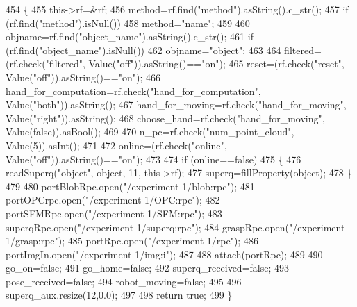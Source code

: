 \begin{DoxyCode}
454     \{
455         this->rf=&rf;
456         method=rf.find(\textcolor{stringliteral}{"method"}).asString().c\_str();
457         \textcolor{keywordflow}{if} (rf.find(\textcolor{stringliteral}{"method"}).isNull())
458             method=\textcolor{stringliteral}{"name"};
459 
460         objname=rf.find(\textcolor{stringliteral}{"object\_name"}).asString().c\_str();
461         \textcolor{keywordflow}{if} (rf.find(\textcolor{stringliteral}{"object\_name"}).isNull())
462             objname=\textcolor{stringliteral}{"object"};
463 
464         filtered=(rf.check(\textcolor{stringliteral}{"filtered"}, Value(\textcolor{stringliteral}{"off"})).asString()==\textcolor{stringliteral}{"on"});
465         reset=(rf.check(\textcolor{stringliteral}{"reset"}, Value(\textcolor{stringliteral}{"off"})).asString()==\textcolor{stringliteral}{"on"});
466         hand\_for\_computation=rf.check(\textcolor{stringliteral}{"hand\_for\_computation"}, Value(\textcolor{stringliteral}{"both"})).asString();
467         hand\_for\_moving=rf.check(\textcolor{stringliteral}{"hand\_for\_moving"}, Value(\textcolor{stringliteral}{"right"})).asString();
468         choose\_hand=rf.check(\textcolor{stringliteral}{"hand\_for\_moving"}, Value(\textcolor{keyword}{false})).asBool();
469 
470         n\_pc=rf.check(\textcolor{stringliteral}{"num\_point\_cloud"}, Value(5)).asInt();
471 
472         online=(rf.check(\textcolor{stringliteral}{"online"}, Value(\textcolor{stringliteral}{"off"})).asString()==\textcolor{stringliteral}{"on"});
473 
474         \textcolor{keywordflow}{if} (online==\textcolor{keyword}{false})
475         \{
476             readSuperq(\textcolor{stringliteral}{"object"}, \textcolor{keywordtype}{object}, 11, this->rf);
477             superq=fillProperty(\textcolor{keywordtype}{object});
478         \}
479 
480         portBlobRpc.open(\textcolor{stringliteral}{"/experiment-1/blob:rpc"});
481         portOPCrpc.open(\textcolor{stringliteral}{"/experiment-1/OPC:rpc"});
482         portSFMRpc.open(\textcolor{stringliteral}{"/experiment-1/SFM:rpc"});
483         superqRpc.open(\textcolor{stringliteral}{"/experiment-1/superq:rpc"});
484         graspRpc.open(\textcolor{stringliteral}{"/experiment-1/grasp:rpc"});
485         portRpc.open(\textcolor{stringliteral}{"/experiment-1/rpc"});
486         portImgIn.open(\textcolor{stringliteral}{"/experiment-1/img:i"});
487 
488         attach(portRpc);
489 
490         go\_on=\textcolor{keyword}{false};
491         go\_home=\textcolor{keyword}{false};
492         superq\_received=\textcolor{keyword}{false};
493         pose\_received=\textcolor{keyword}{false};
494         robot\_moving=\textcolor{keyword}{false};
495 
496         superq\_aux.resize(12,0.0);
497 
498         \textcolor{keywordflow}{return} \textcolor{keyword}{true};
499     \}
\end{DoxyCode}
